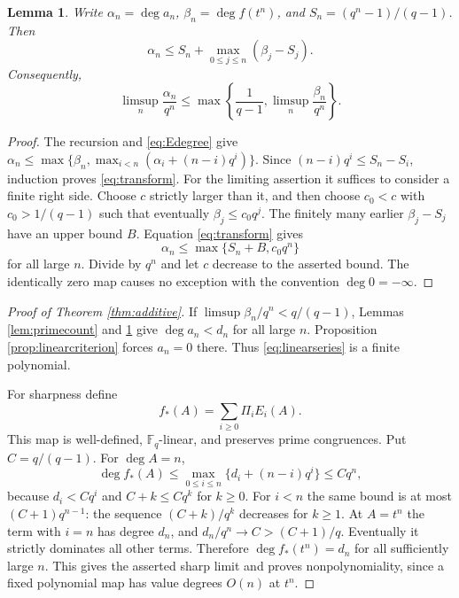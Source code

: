 \documentclass[11pt]{article}
\newtheorem{lemma}[theorem]{Lemma}
\newcommand{\F}{\mathbb F}
\begin{document}
\begin{lemma}\label{lem:transform}
Write $\alpha_n=\deg a_n$, $\beta_n=\deg f(t^n)$, and
$S_n=(q^n-1)/(q-1)$. Then
\begin{equation}\label{eq:transform}
 \alpha_n\le S_n+\max_{0\le j\le n}(\beta_j-S_j).
\end{equation}
Consequently,
\begin{equation}\label{eq:limsup}
 \limsup_n\frac{\alpha_n}{q^n}
 \le\max\left\{\frac1{q-1},\limsup_n\frac{\beta_n}{q^n}\right\}.
\end{equation}
\end{lemma}
\begin{proof}
The recursion and \eqref{eq:Edegree} give
$\alpha_n\le\max\{\beta_n,\max_{i<n}(\alpha_i+(n-i)q^i)\}$.
Since $(n-i)q^i\le S_n-S_i$, induction proves \eqref{eq:transform}.
For the limiting assertion it suffices to consider a finite right side.
Choose $c$ strictly larger than it, and then choose
$c_0<c$ with $c_0>1/(q-1)$ such that eventually $\beta_j\le c_0q^j$.
The finitely many earlier $\beta_j-S_j$ have an upper bound $B$.
Equation \eqref{eq:transform} gives
\[
 \alpha_n\le\max\{S_n+B,c_0q^n\}
\]
for all large $n$. Divide by $q^n$ and let $c$ decrease to the asserted
bound. The identically zero map causes no exception with the convention
$\deg0=-\infty$.
\end{proof}

\begin{proof}[Proof of Theorem \ref{thm:additive}]
If $\limsup\beta_n/q^n<q/(q-1)$, Lemmas \ref{lem:primecount} and
\ref{lem:transform} give $\deg a_n<d_n$ for all large $n$.
Proposition \ref{prop:linearcriterion} forces $a_n=0$ there. Thus
\eqref{eq:linearseries} is a finite polynomial.

For sharpness define
\begin{equation}\label{eq:boundary}
 f_*(A)=\sum_{i\ge0}\Pi_iE_i(A).
\end{equation}
This map is well-defined, $\F_q$-linear, and preserves prime congruences.
Put $C=q/(q-1)$. For $\deg A=n$,
\[
 \deg f_*(A)\le\max_{0\le i\le n}\{d_i+(n-i)q^i\}\le Cq^n,
\]
because $d_i<Cq^i$ and $C+k\le Cq^k$ for $k\ge0$.
For $i<n$ the same bound is at most $(C+1)q^{n-1}$: the sequence
$(C+k)/q^k$ decreases for $k\ge1$.
At $A=t^n$ the term with $i=n$ has degree $d_n$, and
$d_n/q^n\to C>(C+1)/q$. Eventually it strictly dominates all other
terms. Therefore $\deg f_*(t^n)=d_n$ for all sufficiently large $n$.
This gives the asserted sharp limit and proves nonpolynomiality, since
a fixed polynomial map has value degrees $O(n)$ at $t^n$.
\end{proof}
\end{document}
